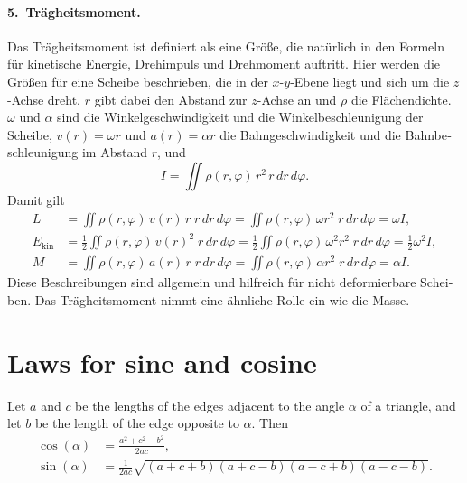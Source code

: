 \begin{otherlanguage}{ngerman}
\paragraph{5.\ Trägheitsmoment.}
Das Trägheitsmoment ist definiert als eine Größe, die natürlich in den
Formeln für kinetische Energie, Drehimpuls und Drehmoment auftritt. Hier
werden die Größen für eine Scheibe beschrieben, die in der
$x$-$y$-Ebene liegt und sich um die $z$-Achse dreht. $r$ gibt dabei den
Abstand zur $z$-Achse an und $\rho$ die Flächendichte.
$\omega$ und $\alpha$ sind die Winkelgeschwindigkeit und die
Winkelbeschleunigung der Scheibe, $v(r) = \omega r$ und $a(r) = \alpha r$
die Bahngeschwindigkeit und die Bahnbeschleunigung im Abstand $r$, und
\[
  I = \iint \rho(r,\varphi) \, r^2 \, r \, dr \, d\varphi .
\]
Damit gilt
\begin{align*}
  L &= \iint \rho(r,\varphi) \, v(r) \, r \; r \, dr \, d\varphi
     = \iint \rho(r,\varphi) \, \omega r^2 \; r \, dr \, d\varphi
     = \omega I , \\
  E_\text{kin} &= \frac{1}{2} \iint \rho(r,\varphi) \, v(r)^2 \; r \, dr \, d\varphi
     = \frac{1}{2} \iint \rho(r,\varphi) \, \omega^2 r^2 \; r \, dr \, d\varphi
     = \frac{1}{2} \omega^2 I , \\
  M &= \iint \rho(r,\varphi) \, a(r) \, r \; r \, dr \, d\varphi
     = \iint \rho(r,\varphi) \, \alpha r^2 \; r \, dr \, d\varphi
     = \alpha I .
\end{align*}
Diese Beschreibungen sind allgemein und hilfreich für nicht deformierbare
Scheiben. Das Trägheitsmoment nimmt eine ähnliche Rolle ein wie die Masse.

\end{otherlanguage}

\section{Laws for sine and cosine}
\label{sec:triangle-laws}

\begin{lemma}
\label{lem:triangle-laws}
Let $a$ and $c$ be the lengths of the edges adjacent to the angle $\alpha$
of a triangle, and let $b$ be the length of the edge opposite to $\alpha$.
Then
\begin{align}
  \cos(\alpha) &= \frac{a^2 + c^2 - b^2}{2ac}, \label{eq:law-of-cosines} \\
  \sin(\alpha) &= \frac{1}{2ac}
    \sqrt{(a+c+b)(a+c-b)(a-c+b)(a-c-b)}. \label{eq:sine-from-sides}
\end{align}
\end{lemma}

